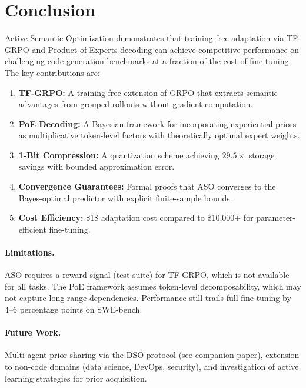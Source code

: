 \section{Conclusion}

\label{sec:conclusion}

Active Semantic Optimization demonstrates that training-free adaptation via
TF-GRPO and Product-of-Experts decoding can achieve competitive performance on
challenging code generation benchmarks at a fraction of the cost of fine-tuning.
The key contributions are:

\begin{enumerate}[leftmargin=1.5em]
    \item \textbf{TF-GRPO:} A training-free extension of GRPO that extracts
          semantic advantages from grouped rollouts without gradient computation.
    \item \textbf{PoE Decoding:} A Bayesian framework for incorporating
          experiential priors as multiplicative token-level factors with
          theoretically optimal expert weights.
    \item \textbf{1-Bit Compression:} A quantization scheme achieving
          $29.5\times$ storage savings with bounded approximation error.
    \item \textbf{Convergence Guarantees:} Formal proofs that ASO converges to
          the Bayes-optimal predictor with explicit finite-sample bounds.
    \item \textbf{Cost Efficiency:} \$18 adaptation cost compared to
          \$10{,}000+ for parameter-efficient fine-tuning.
\end{enumerate}

\paragraph{Limitations.}
ASO requires a reward signal (test suite) for TF-GRPO, which is not available
for all tasks. The PoE framework assumes token-level decomposability, which may
not capture long-range dependencies. Performance still trails full fine-tuning
by 4--6 percentage points on SWE-bench.

\paragraph{Future Work.}
Multi-agent prior sharing via the DSO protocol (see companion paper),
extension to non-code domains (data science, DevOps, security), and
investigation of active learning strategies for prior acquisition.

\appendix

